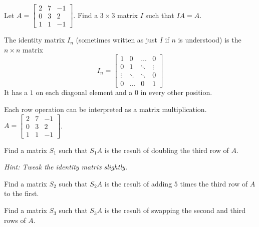 
\begin{applicationActivities}{2}{22}

\begin{activity}{5}
Let $A=\begin{bmatrix} 2 & 7 & -1 \\ 0 & 3 & 2 \\ 1 & 1 & -1 \end{bmatrix}$.  Find a $3 \times 3$ matrix $I$ such that $IA=A$.
\end{activity}

\begin{definition}
The identity matrix $I_n$ (sometimes written as just $I$ if $n$ is understood) is  the $n \times n$ matrix $$I_n = \begin{bmatrix} 1 & 0  & \hdots & 0 \\ 0 & 1 & \ddots & \vdots  \\ \vdots & \ddots & \ddots & 0 \\ 0 & \hdots & 0 & 1 \end{bmatrix}$$
It has a $1$ on each diagonal element and a $0$ in every other position.
\end{definition}

\begin{activity}{15}
Each row operation can be interpreted as a matrix multiplication.  $A=\begin{bmatrix} 2 & 7 & -1 \\ 0 & 3 & 2 \\ 1 & 1 & -1 \end{bmatrix}$.


 \begin{subactivity}
 Find a matrix $S_1$ such that $S_1A$ is the result of doubling the third row of $A$.

 {\em Hint:  Tweak the identity matrix slightly.}
 \end{subactivity}
 \begin{subactivity}
 Find a matrix $S_2$ such that $S_2A$ is the result of adding $5$ times the third row of $A$ to the first.
 \end{subactivity}
\begin{subactivity}
 Find a matrix $S_3$ such that $S_3A$ is the result of swapping the second and third rows of $A$.
 \end{subactivity}


\end{activity}


\end{applicationActivities}
